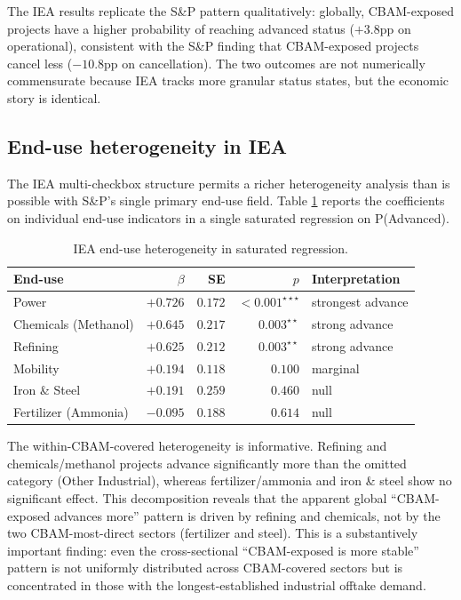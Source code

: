 \documentclass[11pt,a4paper]{article}
\begin{document}
The IEA results replicate the S\&P pattern qualitatively: globally, CBAM-exposed projects have a higher probability of reaching advanced status ($+3.8$pp on operational), consistent with the S\&P finding that CBAM-exposed projects cancel less ($-10.8$pp on cancellation). The two outcomes are not numerically commensurate because IEA tracks more granular status states, but the economic story is identical.

\subsection{End-use heterogeneity in IEA}

The IEA multi-checkbox structure permits a richer heterogeneity analysis than is possible with S\&P's single primary end-use field. Table \ref{tab:ch8-iea-heterogeneity} reports the coefficients on individual end-use indicators in a single saturated regression on P(Advanced).

\begin{table}[ht]
\centering
\caption{IEA end-use heterogeneity in saturated regression.}
\label{tab:ch8-iea-heterogeneity}
\begin{tabular}{lrrrl}
\toprule
End-use & $\beta$ & SE & $p$ & Interpretation \\
\midrule
Power                & $+0.726$ & $0.172$ & $<0.001^{\star\star\star}$ & strongest advance \\
Chemicals (Methanol) & $+0.645$ & $0.217$ & $0.003^{\star\star}$       & strong advance \\
Refining             & $+0.625$ & $0.212$ & $0.003^{\star\star}$       & strong advance \\
Mobility             & $+0.194$ & $0.118$ & $0.100$                    & marginal \\
Iron \& Steel        & $+0.191$ & $0.259$ & $0.460$                    & null \\
Fertilizer (Ammonia) & $-0.095$ & $0.188$ & $0.614$                    & null \\
\bottomrule
\end{tabular}
\end{table}

The within-CBAM-covered heterogeneity is informative. Refining and chemicals/methanol projects advance significantly more than the omitted category (Other Industrial), whereas fertilizer/ammonia and iron \& steel show no significant effect. This decomposition reveals that the apparent global ``CBAM-exposed advances more'' pattern is driven by refining and chemicals, not by the two CBAM-most-direct sectors (fertilizer and steel). This is a substantively important finding: even the cross-sectional ``CBAM-exposed is more stable'' pattern is not uniformly distributed across CBAM-covered sectors but is concentrated in those with the longest-established industrial offtake demand.
\end{document}
